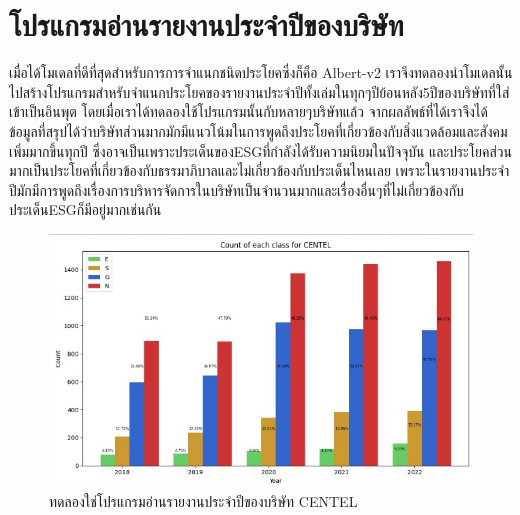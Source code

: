\section{โปรแกรมอ่านรายงานประจำปีของบริษัท}

\enskip \enskip \enskip เมื่อได้โมเดลที่ดีที่สุดสำหรับการการจำแนกชนิดประโยคซึ่งก็คือ Albert-v2  
เราจึงทดลองนำโมเดลนั้นไปสร้างโปรแกรมสำหรับจำแนกประโยคของรายงานประจำปีทั้งเล่มในทุกๆปีย้อนหลัง5ปีของบริษัทที่ใส่เข้าเป็นอินพุต
โดยเมื่อเราได้ทดลองใช้โปรแกรมนั้นกับหลายๆบริษัทแล้ว จากผลลัพธ์ที่ได้เราจึงได้ข้อมูลที่สรุปได้ว่าบริษัทส่วนมากมักมีแนวโน้มในการพูดถึงประโยคที่เกี่ยวข้องกับสิ่งแวดล้อมและสังคมเพิ่มมากขึ้นทุกปี
ซึ่งอาจเป็นเพราะประเด็นของESGที่กำลังได้รับความนิยมในปัจจุบัน
และประโยคส่วนมากเป็นประโยคที่เกี่ยวข้องกับธรรมาภิบาลและไม่เกี่ยวข้องกับประเด็นไหนเลย
เพราะในรายงานประจำปีมักมีการพูดถึงเรื่องการบริหารจัดการในบริษัทเป็นจำนวนมากและเรื่องอื่นๆที่ไม่เกี่ยวข้องกับประเด็นESGก็มีอยู่มากเช่นกัน

\begin{figure}
\begin{center}
\includegraphics{graph.jpg}
\end{center}
\caption[ทดลองใช่โปรแกรมอ่านรายงานประจำปีของบริษัท CENTEL]{ทดลองใช่โปรแกรมอ่านรายงานประจำปีของบริษัท CENTEL}
\label{fig:ทดลองใช่โปรแกรมอ่านรายงานประจำปีของบริษัท CENTEL}
\end{figure}